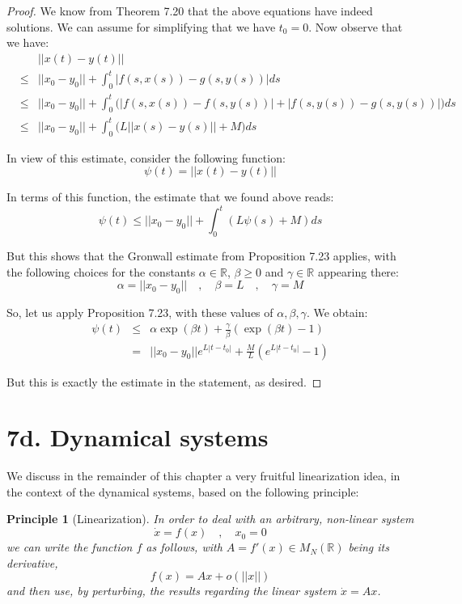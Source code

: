 \documentclass[12pt]{amsbook}
\newtheorem{principle}[theorem]{Principle}
\begin{document}
\begin{proof}
We know from Theorem 7.20 that the above equations have indeed solutions. We can assume for simplifying that we have $t_0=0$. Now observe that we have:
\begin{eqnarray*}
&&||x(t)-y(t)||\\
&\leq&||x_0-y_0||+\int_0^t|f(s,x(s))-g(s,y(s))|ds\\
&\leq&||x_0-y_0||+\int_0^t\Big(|f(s,x(s))-f(s,y(s))|+|f(s,y(s))-g(s,y(s))|\Big)ds\\
&\leq&||x_0-y_0||+\int_0^t\Big(L||x(s)-y(s)||+M\Big)ds
\end{eqnarray*}

In view of this estimate, consider the following function:
$$\psi(t)=||x(t)-y(t)||$$

In terms of this function, the estimate that we found above reads:
$$\psi(t)\leq||x_0-y_0||+\int_0^t(L\psi(s)+M)ds$$

But this shows that the Gronwall estimate from Proposition 7.23 applies, with the following choices for the constants $\alpha\in\mathbb R$, $\beta\geq 0$ and $\gamma\in\mathbb R$ appearing there:
$$\alpha=||x_0-y_0||\quad,\quad \beta=L\quad,\quad \gamma=M$$

So, let us apply Proposition 7.23, with these values of $\alpha,\beta,\gamma$. We obtain:
\begin{eqnarray*}
\psi(t)
&\leq&\alpha\exp(\beta t)+\frac{\gamma}{\beta}(\exp(\beta t)-1)\\
&=&||x_0-y_0||e^{L|t-t_0|}+\frac{M}{L}\left(e^{L|t-t_0|}-1\right)
\end{eqnarray*}

But this is exactly the estimate in the statement, as desired.
\end{proof}

\section*{7d. Dynamical systems}

We discuss in the remainder of this chapter a very fruitful linearization idea, in the context of the dynamical systems, based on the following principle:

\begin{principle}[Linearization]
In order to deal with an arbitrary, non-linear system
$$\dot{x}=f(x)\quad,\quad x_0=0$$
we can write the function $f$ as follows, with $A=f'(x)\in M_N(\mathbb R)$ being its derivative,
$$f(x)=Ax+o(||x||)$$
and then use, by perturbing, the results regarding the linear system $\dot{x}=Ax$.
\end{principle}
\end{document}

